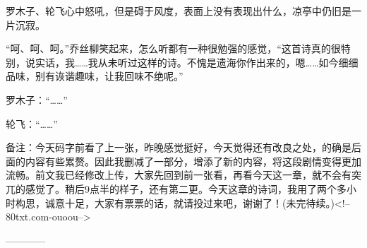 \begin{this_body}
罗木子、轮飞心中怒吼，但是碍于风度，表面上没有表现出什么，凉亭中仍旧是一片沉寂。

“呵、呵、呵。”乔丝柳笑起来，怎么听都有一种很勉强的感觉，“这首诗真的很特别，说实话，我……我从未听过这样的诗。不愧是遗海你作出来的，嗯……如今细细品味，别有诙谐趣味，让我回味不绝呢。”

罗木子：“……”

轮飞：“……”

备注：今天码字前看了上一张，昨晚感觉挺好，今天觉得还有改良之处，的确是后面的内容有些累赘。因此我删减了一部分，增添了新的内容，将这段剧情变得更加流畅。前文我已经修改上传，大家先回到前一张看，再看今天这一章，就不会有突兀的感觉了。稍后9点半的样子，还有第二更。今天这章的诗词，我用了两个多小时构思，诚意十足，大家有票票的话，就请投过来吧，谢谢了！(未完待续。)<!--80txt.com-ouoou-->

------------

\end{this_body}

